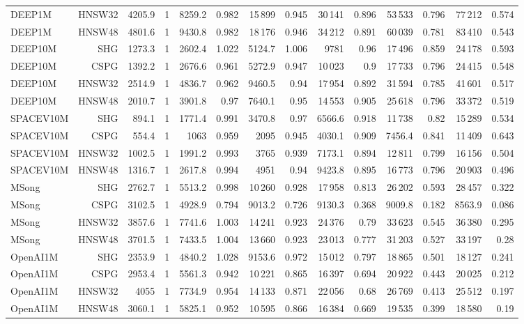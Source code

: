 \begin{table}[t]
\begin{tabular}{lrrrrrrrrrrrrr}
DEEP1M & HNSW32 & 4205.9 & 1 & 8259.2 & 0.982 & 15\,899 & 0.945 & 30\,141 & 0.896 & 53\,533 & 0.796 & 77\,212 & 0.574 \\
DEEP1M & HNSW48 & 4801.6 & 1 & 9430.8 & 0.982 & 18\,176 & 0.946 & 34\,212 & 0.891 & 60\,039 & 0.781 & 83\,410 & 0.543 \\
DEEP10M & SHG & 1273.3 & 1 & 2602.4 & 1.022 & 5124.7 & 1.006 & 9781 & 0.96 & 17\,496 & 0.859 & 24\,178 & 0.593 \\
DEEP10M & CSPG & 1392.2 & 1 & 2676.6 & 0.961 & 5272.9 & 0.947 & 10\,023 & 0.9 & 17\,733 & 0.796 & 24\,415 & 0.548 \\
DEEP10M & HNSW32 & 2514.9 & 1 & 4836.7 & 0.962 & 9460.5 & 0.94 & 17\,954 & 0.892 & 31\,594 & 0.785 & 41\,601 & 0.517 \\
DEEP10M & HNSW48 & 2010.7 & 1 & 3901.8 & 0.97 & 7640.1 & 0.95 & 14\,553 & 0.905 & 25\,618 & 0.796 & 33\,372 & 0.519 \\
SPACEV10M & SHG & 894.1 & 1 & 1771.4 & 0.991 & 3470.8 & 0.97 & 6566.6 & 0.918 & 11\,738 & 0.82 & 15\,289 & 0.534 \\
SPACEV10M & CSPG & 554.4 & 1 & 1063 & 0.959 & 2095 & 0.945 & 4030.1 & 0.909 & 7456.4 & 0.841 & 11\,409 & 0.643 \\
SPACEV10M & HNSW32 & 1002.5 & 1 & 1991.2 & 0.993 & 3765 & 0.939 & 7173.1 & 0.894 & 12\,811 & 0.799 & 16\,156 & 0.504 \\
SPACEV10M & HNSW48 & 1316.7 & 1 & 2617.8 & 0.994 & 4951 & 0.94 & 9423.8 & 0.895 & 16\,773 & 0.796 & 20\,903 & 0.496 \\
MSong & SHG & 2762.7 & 1 & 5513.2 & 0.998 & 10\,260 & 0.928 & 17\,958 & 0.813 & 26\,202 & 0.593 & 28\,457 & 0.322 \\
MSong & CSPG & 3102.5 & 1 & 4928.9 & 0.794 & 9013.2 & 0.726 & 9130.3 & 0.368 & 9009.8 & 0.182 & 8563.9 & 0.086 \\
MSong & HNSW32 & 3857.6 & 1 & 7741.6 & 1.003 & 14\,241 & 0.923 & 24\,376 & 0.79 & 33\,623 & 0.545 & 36\,380 & 0.295 \\
MSong & HNSW48 & 3701.5 & 1 & 7433.5 & 1.004 & 13\,660 & 0.923 & 23\,013 & 0.777 & 31\,203 & 0.527 & 33\,197 & 0.28 \\
OpenAI1M & SHG & 2353.9 & 1 & 4840.2 & 1.028 & 9153.6 & 0.972 & 15\,012 & 0.797 & 18\,865 & 0.501 & 18\,127 & 0.241 \\
OpenAI1M & CSPG & 2953.4 & 1 & 5561.3 & 0.942 & 10\,221 & 0.865 & 16\,397 & 0.694 & 20\,922 & 0.443 & 20\,025 & 0.212 \\
OpenAI1M & HNSW32 & 4055 & 1 & 7734.9 & 0.954 & 14\,133 & 0.871 & 22\,056 & 0.68 & 26\,769 & 0.413 & 25\,512 & 0.197 \\
OpenAI1M & HNSW48 & 3060.1 & 1 & 5825.1 & 0.952 & 10\,595 & 0.866 & 16\,384 & 0.669 & 19\,535 & 0.399 & 18\,580 & 0.19 \\
\bottomrule
\end{tabular}
\end{table}
